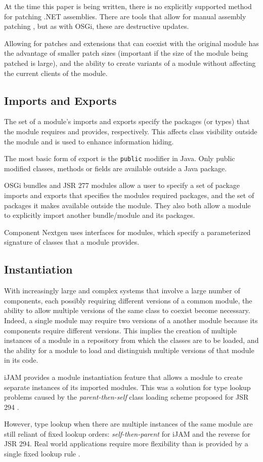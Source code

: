 At the time this paper is being written, there is no explicitly supported method for
patching .NET assemblies. There are tools that allow for manual assembly patching 
\cite{reflexil, monocecil}, but as with OSGi, these are destructive updates.

Allowing for patches and extensions that can coexist with the original module has the
advantage of smaller patch sizes (important if the size of the module being patched is
large), and the ability to create variants of a module without affecting the current
clients of the module.

\subsection{Imports and Exports}

The set of a module's imports and exports specify the packages (or types) that
the module requires and provides, respectively. This affects class
visibility outside the module and is used to enhance information hiding. 

The most basic form of export is the {\tt public} modifier in Java. Only
public modified classes, methods or fields are available outside a Java package.

OSGi bundles and JSR 277 modules allow a user to specify a set of package imports 
and exports that specifies the modules required packages, and the set of packages 
it makes available outside the module. They also both allow a module
to explicitly import another bundle/module and its packages.

Component Nextgen \cite{componentnextgen} uses interfaces for modules, which
specify a parameterized signature of classes that a module provides.

\subsection{Instantiation}
With increasingly large and complex systems that involve a large number of components,
each possibly requiring different versions of a common module,
the ability to allow multiple versions of the same class to coexist become necessary.
Indeed, a single module may require two versions of a another module because its
components require different versions. This implies the creation of multiple instances 
of a module in a repository from which the classes are to be loaded, and the ability
for a module to load and distinguish multiple versions of that module in its code.

iJAM \cite{iJAM} provides a module instantiation feature that allows a module to create
separate instances of its imported modules. This was a solution for type lookup
problems caused by the {\it parent-then-self} class loading scheme proposed for
JSR 294 \cite{JSR294}.

However, type lookup when there are multiple instances of the same module are still
reliant of fixed lookup orders: {\it self-then-parent} for iJAM and the reverse for JSR 294.
Real world applications require more flexibility than is provided by a single fixed
lookup rule \cite{iJAMComments}.